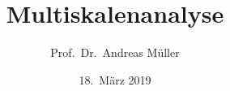 %
%
%
\usepackage[utf8]{inputenc}
\usepackage[T1]{fontenc}
\usepackage{epic}
\usepackage{color}
\usepackage{array}
\usepackage{ifthen}
\usepackage{amsmath}
\usepackage{lmodern}
\usepackage{tikz}
\usetikzlibrary{shapes.geometric}
\beamertemplatenavigationsymbolsempty
\title[MSA]{Multiskalenanalyse}
\author[A.~Müller]{Prof.~Dr.~Andreas Müller}
\date[]{18.~März 2019}

\theoremstyle{definition}
\newtheorem{beispiel}{Beispiel}
\newtheorem{folgerungen}{Folgerungen}
\newtheorem{frage}{Frage}
\newtheorem{raumW}{Orthogonalkomplement $W_j$}
\newtheorem{osumme}{Orthogonale Summe}
\newtheorem{haarfall}{Spezialfall Haar-Wavelet}

\newenvironment{linsys}[1]{%
\begin{tabular}{*{#1}{\linsysR@{\;}\linsysC}@{\;}\linsysR}}%
{\end{tabular}}

